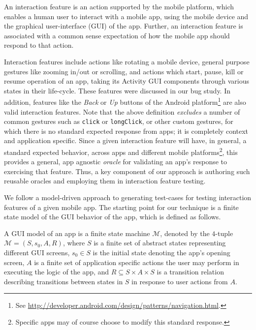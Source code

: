 
\begin{mydef}
\label{def:interactionFeature}
An interaction feature is an action supported by the mobile platform, which enables a human user to interact with a mobile app, using the mobile device and the graphical user-interface (GUI) of the app. Further, an interaction feature is associated with a common sense expectation of how the mobile app should respond to that action. 
\end{mydef}
\vspace*{-2ex}

Interaction features include actions like rotating a mobile device, general purpose gestures like zooming in/out or scrolling, and actions which start, pause, kill or resume operation of an app, taking its Activity GUI components through various states in their life-cycle. These features were discussed in our bug study. In addition, features like the \textit{Back} or \textit{Up} buttons of the Android platform\footnote{See \url{http://developer.android.com/design/patterns/navigation.html}.} are also valid interaction features. Note that the above definition \textit{excludes} a number of common gestures such as {\small\texttt{click}} or {\small\texttt{longClick}}, or other custom gestures, for which there is no standard expected response from apps; it is completely context and application specific. Since a given interaction feature will have, in general, a standard expected behavior, across apps and different mobile platforms\footnote{Specific apps may of course choose to modify this standard response.}, this provides a general, app agnostic \textit{oracle} for validating an app's response to exercising that feature. Thus, a key component of our approach is authoring such reusable oracles and employing them in interaction feature testing.

We follow a model-driven approach to generating test-cases for testing interaction features of a given mobile app. The starting point for our technique is a finite state model of the GUI behavior of the app, which is defined as follows.

\begin{mydef}
\label{def:GUImodel}
A GUI model of an app is a finite state machine $\mathcal{M}$, denoted by the $4$-tuple $\mathcal{M} = (S, s_0, A, R)$, where $S$ is a finite set of abstract states representing different GUI screens, $s_0 \in S$ is the initial state denoting the app's opening screen, $A$ is a finite set of application specific actions the user may perform in executing the logic of the app, and $R \subseteq S \times A \times S$ is a transition relation describing transitions between states in $S$ in response to user actions from $A$.  
\end{mydef} 
\vspace*{-2ex}

